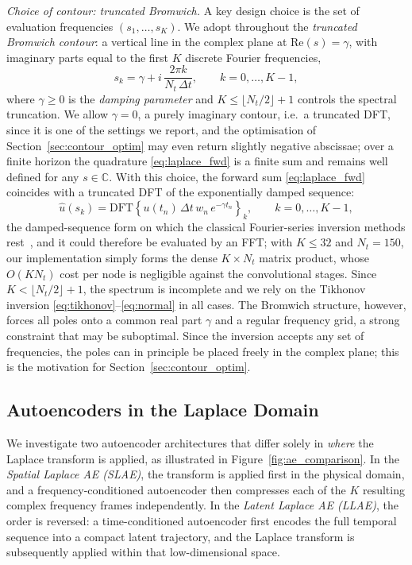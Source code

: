 ﻿\documentclass[a4paper,12pt]{article}
\theoremstyle{definition}
\theoremstyle{remark}
\newcommand{\C}{\mathbb{C}}
\begin{document}
\emph{Choice of contour: truncated Bromwich.}
A key design choice is the set of evaluation frequencies $(s_1, \dots, s_K)$. We adopt throughout the \emph{truncated Bromwich contour}: a vertical line in the complex plane at $\mathrm{Re}(s) = \gamma$, with imaginary parts equal to the first $K$ discrete Fourier frequencies,
\begin{equation}
    s_k = \gamma + i\,\frac{2\pi k}{N_t\,\Delta t}, \qquad k = 0, \dots, K-1,
    \label{eq:bromwich}
\end{equation}
where $\gamma \ge 0$ is the \emph{damping parameter} and $K \le \lfloor N_t/2 \rfloor + 1$ controls the spectral truncation. We allow $\gamma = 0$, a purely imaginary contour, i.e.\ a truncated DFT, since it is one of the settings we report, and the optimisation of Section~\ref{sec:contour_optim} may even return slightly negative abscissae; over a finite horizon the quadrature \eqref{eq:laplace_fwd} is a finite sum and remains well defined for any $s \in \C$. With this choice, the forward sum \eqref{eq:laplace_fwd} coincides with a truncated DFT of the exponentially damped sequence:
\begin{equation}
    \hat{u}(s_k) = \mathrm{DFT}\!\left\{ u(t_n)\,\Delta t\,w_n\,e^{-\gamma t_n} \right\}_k, \qquad k = 0,\dots,K-1,
\end{equation}
the damped-sequence form on which the classical Fourier-series inversion methods rest~\cite{abate1992fourier}, and it could therefore be evaluated by an FFT; with $K \le 32$ and $N_t = 150$, our implementation simply forms the dense $K \times N_t$ matrix product, whose $O(K N_t)$ cost per node is negligible against the convolutional stages. Since $K < \lfloor N_t/2\rfloor + 1$, the spectrum is incomplete and we rely on the Tikhonov inversion \eqref{eq:tikhonov}--\eqref{eq:normal} in all cases. The Bromwich structure, however, forces all poles onto a common real part $\gamma$ and a regular frequency grid, a strong constraint that may be suboptimal. Since the inversion accepts any set of frequencies, the poles can in principle be placed freely in the complex plane; this is the motivation for Section~\ref{sec:contour_optim}.

\subsection{Autoencoders in the Laplace Domain}

We investigate two autoencoder architectures that differ solely in \emph{where} the Laplace transform is applied, as illustrated in Figure~\ref{fig:ae_comparison}. In the \emph{Spatial Laplace AE (SLAE)}, the transform is applied first in the physical domain, and a frequency-conditioned autoencoder then compresses each of the $K$ resulting complex frequency frames independently. In the \emph{Latent Laplace AE (LLAE)}, the order is reversed: a time-conditioned autoencoder first encodes the full temporal sequence into a compact latent trajectory, and the Laplace transform is subsequently applied within that low-dimensional space.
\end{document}
